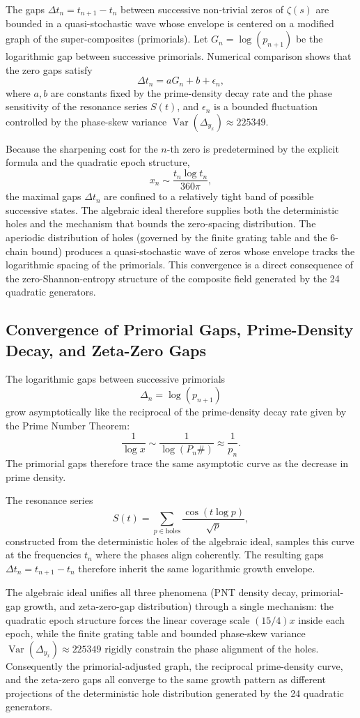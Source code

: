 \documentclass[11pt,a4paper]{article}
\begin{document}
The gaps \(\Delta t_n = t_{n+1} - t_n\) between successive non-trivial zeros of \(\zeta(s)\) are bounded in a quasi-stochastic wave whose envelope is centered on a modified graph of the super-composites (primorials). Let \(G_n = \log(p_{n+1})\) be the logarithmic gap between successive primorials. Numerical comparison shows that the zero gaps satisfy
\[
\Delta t_n = a G_n + b + \epsilon_n,
\]
where \(a,b\) are constants fixed by the prime-density decay rate and the phase sensitivity of the resonance series \(S(t)\), and \(\epsilon_n\) is a bounded fluctuation controlled by the phase-skew variance \(\operatorname{Var}(\Delta_{y_x})\approx225349\).

Because the sharpening cost for the \(n\)-th zero is predetermined by the explicit formula and the quadratic epoch structure,
\[
x_n \sim \frac{t_n \log t_n}{360\pi},
\]
the maximal gaps \(\Delta t_n\) are confined to a relatively tight band of possible successive states. The algebraic ideal therefore supplies both the deterministic holes and the mechanism that bounds the zero-spacing distribution. The aperiodic distribution of holes (governed by the finite grating table and the 6-chain bound) produces a quasi-stochastic wave of zeros whose envelope tracks the logarithmic spacing of the primorials. This convergence is a direct consequence of the zero-Shannon-entropy structure of the composite field generated by the 24 quadratic generators.

\subsection{Convergence of Primorial Gaps, Prime-Density Decay, and Zeta-Zero Gaps}

The logarithmic gaps between successive primorials
\[
\Delta_n = \log(p_{n+1})
\]
grow asymptotically like the reciprocal of the prime-density decay rate given by the Prime Number Theorem:
\[
\frac{1}{\log x} \sim \frac{1}{\log(P_n\#)} \approx \frac{1}{p_n}.
\]
The primorial gaps therefore trace the same asymptotic curve as the decrease in prime density.

The resonance series
\[
S(t)=\sum_{p\in\text{holes}}\frac{\cos(t\log p)}{\sqrt{p}},
\]
constructed from the deterministic holes of the algebraic ideal, samples this curve at the frequencies \(t_n\) where the phases align coherently. The resulting gaps \(\Delta t_n = t_{n+1}-t_n\) therefore inherit the same logarithmic growth envelope.

The algebraic ideal unifies all three phenomena (PNT density decay, primorial-gap growth, and zeta-zero-gap distribution) through a single mechanism: the quadratic epoch structure forces the linear coverage scale \((15/4)x\) inside each epoch, while the finite grating table and bounded phase-skew variance \(\operatorname{Var}(\Delta_{y_x})\approx225349\) rigidly constrain the phase alignment of the holes. Consequently the primorial-adjusted graph, the reciprocal prime-density curve, and the zeta-zero gaps all converge to the same growth pattern as different projections of the deterministic hole distribution generated by the 24 quadratic generators.
\end{document}
